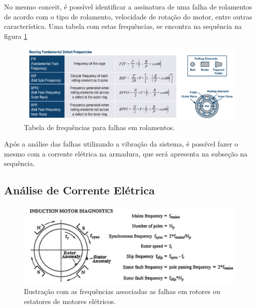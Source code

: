 No mesmo conceit, é possível identificar a assinatura de uma falha de rolamentos de acordo com o tipo de rolamento, velocidade de rotação
do motor, entre outras característica. Uma tabela com estas frequências, se encontra na sequência na figura \ref{fig:bearing_table_analog_p3}


\begin{figure}[H]
    \caption{Tabela de frequências para falhas em rolamentos.}
    \begin{center}
        \includegraphics[scale=.5]{referencial/img/bearing_table_analog_p3.png}
    \end{center}
    \label{fig:bearing_table_analog_p3}
\end{figure}

Após a análise das falhas utilizando a vibração da sistema, é possível fazer o mesmo com a corrente elétrica na armadura, que será
apresenta na subseção na sequência.


% 

\subsection{Análise de Corrente Elétrica }\label{sec:}

\begin{figure}[H]
    \caption{Ilustração com as frequências associadas as falhas em rotores ou estatores de motores elétricos.}
    \begin{center}
        \includegraphics[scale=.35]{referencial/img/fault_freq_randall_p55.png}
    \end{center}
    \label{fig:fault_freq_randall_p55}
\end{figure}


